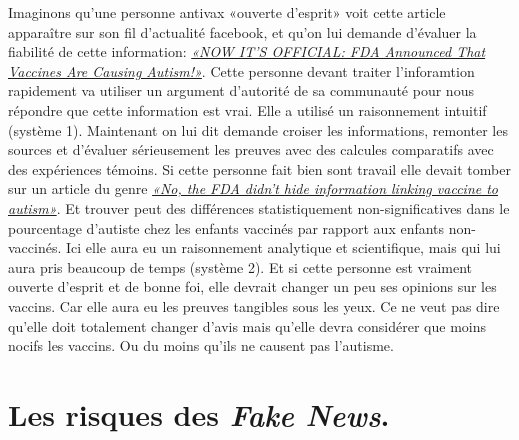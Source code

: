 \documentclass[11pt,a4paper,oldfontcommands]{memoir}
\begin{document}
Imaginons qu'une personne antivax «ouverte d'esprit» voit cette article apparaître sur son fil d'actualité facebook, et qu'on lui demande d'évaluer la fiabilité de cette information:
\href{https://healingoracle.ch/2018/02/20/now-its-official-fda-announced-that-vaccines-are-causing-autism/}{\textit{«NOW IT’S OFFICIAL: FDA Announced That Vaccines Are Causing Autism!»}}. Cette personne devant traiter l'inforamtion rapidement va utiliser un argument d'autorité de sa communauté pour nous répondre que cette information est vrai. Elle a utilisé un raisonnement intuitif (système 1).
Maintenant on lui dit demande croiser les informations, remonter les sources et d'évaluer sérieusement les preuves avec des calcules comparatifs avec des expériences témoins. Si cette personne fait bien sont travail elle devait tomber sur un article du genre \href{http://www.politifact.com/punditfact/statements/2017/dec/19/truthcommandcom/no-fda-didnt-hide-information-linking-vaccine-auti/}{\textit{«No, the FDA didn't hide information linking vaccine to autism»}}. Et trouver peut des différences statistiquement non-significatives dans le pourcentage d'autiste chez les enfants vaccinés par rapport aux enfants non-vaccinés. Ici elle aura eu un raisonnement analytique et scientifique, mais qui lui aura pris beaucoup de temps (système 2).
Et si cette personne est vraiment ouverte d'esprit et de bonne foi, elle devrait changer un peu ses opinions sur les vaccins. Car elle aura eu les preuves tangibles sous les yeux. Ce ne veut pas dire qu'elle doit totalement changer d'avis mais qu'elle devra considérer que moins nocifs les vaccins. Ou du moins qu'ils ne causent pas l'autisme.


\section{Les risques des \textit{Fake News}.}
\end{document}
